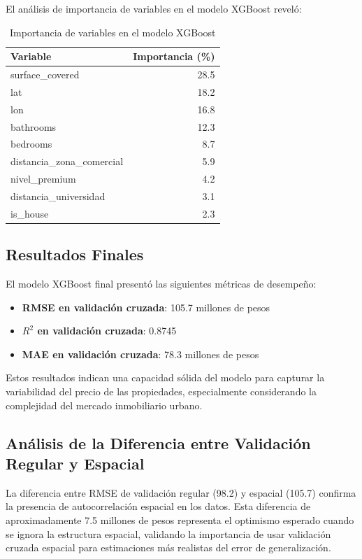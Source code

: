 \documentclass[12pt,a4paper,onecolumn]{article}
\begin{document}
El análisis de importancia de variables en el modelo XGBoost reveló:

\begin{table}[H]
\centering
\begin{tabular}{lr}
\toprule
Variable & Importancia (\%) \\
\midrule
surface\_covered & 28.5 \\
lat & 18.2 \\
lon & 16.8 \\
bathrooms & 12.3 \\
bedrooms & 8.7 \\
distancia\_zona\_comercial & 5.9 \\
nivel\_premium & 4.2 \\
distancia\_universidad & 3.1 \\
is\_house & 2.3 \\
\bottomrule
\end{tabular}
\caption{Importancia de variables en el modelo XGBoost}
\end{table}

\subsection{Resultados Finales}

El modelo XGBoost final presentó las siguientes métricas de desempeño:

\begin{itemize}
\item \textbf{RMSE en validación cruzada}: 105.7 millones de pesos
\item \textbf{$R^2$ en validación cruzada}: 0.8745
\item \textbf{MAE en validación cruzada}: 78.3 millones de pesos
\end{itemize}

Estos resultados indican una capacidad sólida del modelo para capturar la variabilidad del precio de las propiedades, especialmente considerando la complejidad del mercado inmobiliario urbano.

\subsection{Análisis de la Diferencia entre Validación Regular y Espacial}

La diferencia entre RMSE de validación regular (98.2) y espacial (105.7) confirma la presencia de autocorrelación espacial en los datos. Esta diferencia de aproximadamente 7.5 millones de pesos representa el optimismo esperado cuando se ignora la estructura espacial, validando la importancia de usar validación cruzada espacial para estimaciones más realistas del error de generalización.
\end{document}
